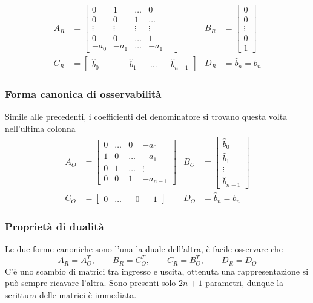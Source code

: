 $$
\begin{aligned}
A_R &= \begin{bmatrix}
0 & 1 & \dots & 0\\
0 & 0 & 1 & \dots & \\
\vdots & \vdots & \vdots & \vdots \\
0 & 0 & \dots  & 1 \\
-a_0 & -a_1 & \dots & -a_1
\end{bmatrix}
 &
B_R &= \begin{bmatrix}
0 \\ 0 \\ \vdots\\ 0\\ 1
\end{bmatrix}\\
C_R & = \begin{bmatrix}
\hat{b}_0 & \qquad &  \hat{b}_1& &\dots& & \hat{b}_{n-1}
\end{bmatrix} &
D_R&= \hat{b}_n = b_n
\end{aligned}$$


\subsubsection{Forma canonica di osservabilità}
Simile alle precedenti, i coefficienti del denominatore si trovano questa volta
nell'ultima colonna
$$\begin{aligned}
A_O &= \begin{bmatrix}
0 & \dots & 0 & -a_0\\
1 & 0 & \dots & -a_1\\
0 & 1 & \dots & \vdots\\
0 & 0 & 1 & -a_{n-1}
\end{bmatrix}&
B_O &= \begin{bmatrix}
\hat{b}_0 \\ \hat{b}_1 \\ \vdots \\ \hat{b}_{n-1}
\end{bmatrix}\\
C_O & = \begin{bmatrix}
0 & \dots & & 0 & & 1
\end{bmatrix} &
D_O &= \hat{b}_n = b_n
\end{aligned}$$

\subsubsection{Proprietà di dualità}
Le due forme canoniche sono l'una la duale dell'altra, è facile osservare che
$$
A_R = A_O^T,\qquad B_R = C_O^T,\qquad C_R=B_O^T,\qquad D_R=D_O
$$
C'è uno scambio di matrici tra ingresso e uscita, ottenuta una rappresentazione
si può sempre ricavare l'altra.
Sono presenti solo $2n+1$ parametri, dunque la scrittura delle matrici è
immediata.

